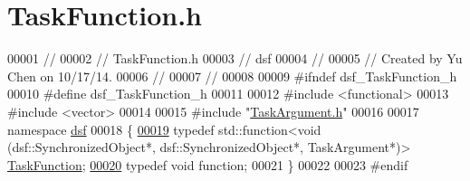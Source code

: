 \hypertarget{_task_function_8h_source}{}\section{Task\+Function.\+h}
\label{_task_function_8h_source}

\begin{DoxyCode}
00001 \textcolor{comment}{//}
00002 \textcolor{comment}{//  TaskFunction.h}
00003 \textcolor{comment}{//  dsf}
00004 \textcolor{comment}{//}
00005 \textcolor{comment}{//  Created by Yu Chen on 10/17/14.}
00006 \textcolor{comment}{//}
00007 \textcolor{comment}{//}
00008 
00009 \textcolor{preprocessor}{#ifndef dsf\_TaskFunction\_h}
00010 \textcolor{preprocessor}{#define dsf\_TaskFunction\_h}
00011 
00012 \textcolor{preprocessor}{#include <functional>}
00013 \textcolor{preprocessor}{#include <vector>}
00014 
00015 \textcolor{preprocessor}{#include "\hyperlink{_task_argument_8h}{TaskArgument.h}"}
00016 
00017 \textcolor{keyword}{namespace }\hyperlink{namespacedsf}{dsf}
00018 \{
\hypertarget{_task_function_8h_source_l00019}{}\hyperlink{namespacedsf_aa16e735f29587f4485b56fc46746f7a9}{00019}     \textcolor{keyword}{typedef} std::function<void (dsf::SynchronizedObject*, dsf::SynchronizedObject*, TaskArgument*)> 
      \hyperlink{namespacedsf_aa16e735f29587f4485b56fc46746f7a9}{TaskFunction};
\hypertarget{_task_function_8h_source_l00020}{}\hyperlink{namespacedsf_a3ad20407a44eaf5ce4cf784a60c1b92b}{00020}     \textcolor{keyword}{typedef} \textcolor{keywordtype}{void} \textcolor{keyword}{function};
00021 \}
00022 
00023 \textcolor{preprocessor}{#endif}
\end{DoxyCode}
